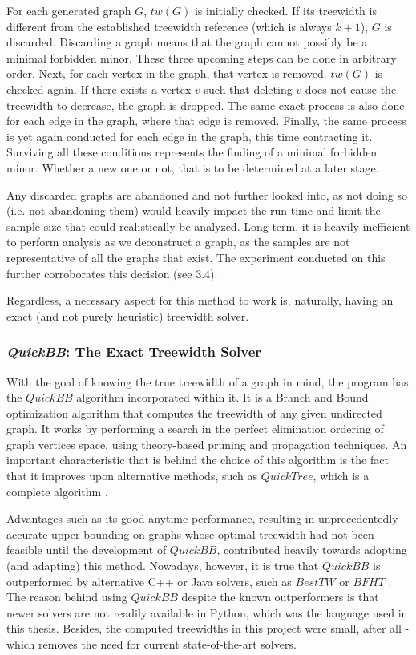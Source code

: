 For each generated graph $G$, $tw(G)$ is initially checked. If its treewidth is different from the established treewidth reference (which is always $k+1$), $G$ is discarded. Discarding a graph means that the graph cannot possibly be a minimal forbidden minor. These three upcoming steps can be done in arbitrary order. Next, for each vertex in the graph, that vertex is removed. $tw(G)$ is checked again. If there exists a vertex $v$ such that deleting $v$ does not cause the treewidth to decrease, the graph is dropped. The same exact process is also done for each edge in the graph, where that edge is removed. Finally, the same process is yet again conducted for each edge in the graph, this time contracting it. Surviving all these conditions represents the finding of a minimal forbidden minor. Whether a new one or not, that is to be determined at a later stage. 

Any discarded graphs are abandoned and not further looked into, as not doing so (i.e. not abandoning them) would heavily impact the run-time and limit the sample size that could realistically be analyzed. Long term, it is heavily inefficient to perform analysis as we deconstruct a graph, as the samples are not representative of all the graphs that exist. The experiment conducted on this further corroborates this decision (see 3.4).

Regardless, a necessary aspect for this method to work is, naturally, having an exact (and not purely heuristic) treewidth solver.

\subsubsection{\textit{QuickBB}: The Exact Treewidth Solver}
With the goal of knowing the true treewidth of a graph in mind, the program has the $QuickBB$ algorithm \cite{gogate2004} incorporated within it. It is a Branch and Bound optimization algorithm that computes the treewidth of any given undirected graph. It works by performing a search in the perfect elimination ordering of graph vertices space, using theory-based pruning and propagation techniques. An important characteristic that is behind the choice of this algorithm is the fact that it improves upon alternative methods, such as $QuickTree$, which is a complete algorithm \cite{gogate2004}. 

Advantages such as its good anytime performance, resulting in unprecedentedly accurate upper bounding on graphs whose optimal treewidth had not been feasible until the development of $QuickBB$, contributed heavily towards adopting (and adapting) this method. Nowadays, however, it is true that $QuickBB$ is outperformed by alternative C++ or Java solvers, such as $BestTW$ or $BFHT$ \cite{dow2007}. The reason behind using $QuickBB$ despite the known outperformers is that newer solvers are not readily available in Python, which was the language used in this thesis. Besides, the computed treewidths in this project were small, after all - which removes the need for current state-of-the-art solvers.

